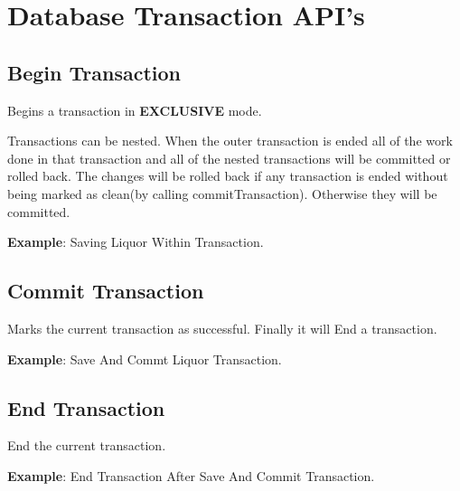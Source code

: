 \section{Database Transaction API's}

	\subsection{Begin Transaction}
	

	\par
	Begins a transaction in \textbf{EXCLUSIVE} mode.

	\par
	Transactions can be nested. When the outer transaction is ended all of the work done in that transaction and all of the nested transactions will be committed or rolled back. The changes will be rolled back if any transaction is ended without being marked as clean(by calling commitTransaction). Otherwise they will be committed.

				\par
				\textbf{Example}: Saving Liquor Within Transaction.
					


	\subsection{Commit Transaction}
	

	\par
	Marks the current transaction as successful. Finally it will End a transaction.

				\par
				\textbf{Example}: Save And Commt Liquor Transaction.
					

	
	\subsection{End Transaction}
	

	\par
	End the current transaction.

				\par
				\textbf{Example}: End Transaction After Save And Commit Transaction.
					


